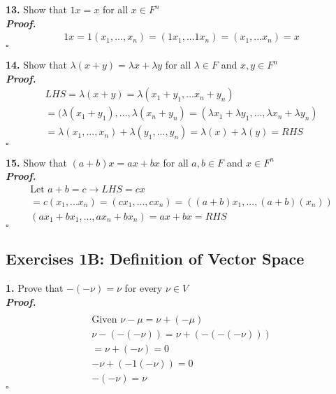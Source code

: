 \documentclass[12pt]{article} %
\newenvironment{solution}[1][\it{Proof}]{\textbf{#1. } }{$\square$}
\begin{document}
\textbf{13.} Show that $1x = x$ for all $x \in F^n$ \\

\begin{solution}
\begin{align*}
    & 1x = 1(x_1,...,x_n) = (1x_1,...1x_n) = (x_1,...x_n) = x &
\end{align*}
\end{solution}

\textbf{14.} Show that $\lambda(x+y) = \lambda x + \lambda y$ for all $\lambda \in F$ and $x,y \in F^n$ \\

\begin{solution}
\begin{align*}
    &  LHS = \lambda(x+y) = \lambda(x_1+y_1,...x_n+y_n) & \\
    & = (\lambda(x_1 +y_1), ..., \lambda(x_n+y_n) = (\lambda x_1 + \lambda y_1,...,\lambda x_n + \lambda y_n) & \\
    & = \lambda(x_1,...,x_n) + \lambda(y_1,...,y_n) = \lambda(x) + \lambda(y)  = RHS &
\end{align*}
\end{solution}

\textbf{15.} Show that $(a+b)x = ax + bx$ for all $a,b \in F$ and $x \in F^n$ \\

\begin{solution}
\begin{align*}
    & \text{Let } a+b  = c \rightarrow LHS = cx & \\
    & = c(x_1,...x_n) = (cx_1,...,cx_n) = ((a+b)x_1,...,(a+b)(x_n)) & \\
    & (ax_1 + bx_1,...,ax_n + bx_n) = ax + bx = RHS
\end{align*}
\end{solution}


\subsection*{Exercises 1B: Definition of Vector Space}

\textbf{1. } Prove that $-(-\nu) = \nu$ for every $\nu \in V$ \\

\begin{solution}
\begin{align*}  \\
\text{Given } \nu - \mu = \nu +(-\mu)  \\
\nu - (-(-\nu)) = \nu + (-(-(-\nu))) \\
= \nu + (-\nu) = 0  \\
-\nu +(-1(-\nu)) = 0  \\
-(-\nu) = \nu
\end{align*}
\end{solution}
\end{document}
